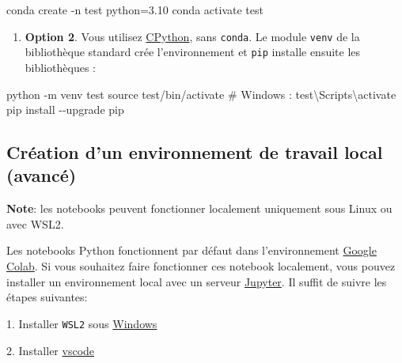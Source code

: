 \documentclass[
  french,
  11pt,
  letterpaper,
  open=any,
  twoside=false,
  french]{scrbook}
\newenvironment{Shaded}{\begin{snugshade}}{\end{snugshade}}
\newcommand{\AttributeTok}[1]{\textcolor[rgb]{0.40,0.45,0.13}{#1}}
\newcommand{\BuiltInTok}[1]{\textcolor[rgb]{0.00,0.23,0.31}{#1}}
\newcommand{\CommentTok}[1]{\textcolor[rgb]{0.37,0.37,0.37}{#1}}
\newcommand{\ExtensionTok}[1]{\textcolor[rgb]{0.00,0.23,0.31}{#1}}
\newcommand{\NormalTok}[1]{\textcolor[rgb]{0.00,0.23,0.31}{#1}}
\providecommand{\tightlist}{%
  \setlength{\itemsep}{0pt}\setlength{\parskip}{0pt}}
\begin{document}
\begin{Shaded}
\begin{Highlighting}[]
\ExtensionTok{conda}\NormalTok{ create }\AttributeTok{{-}n}\NormalTok{ test python=3.10}
\ExtensionTok{conda}\NormalTok{ activate test}
\end{Highlighting}
\end{Shaded}

\begin{enumerate}
\def\labelenumi{\arabic{enumi}.}
\setcounter{enumi}{1}
\tightlist
\item
  \textbf{Option 2}. Vous utilisez
  \href{https://www.python.org/downloads/}{CPython}, sans
  \texttt{conda}. Le module \texttt{venv} de la bibliothèque standard
  crée l'environnement et \texttt{pip} installe ensuite les
  bibliothèques :
\end{enumerate}

\begin{Shaded}
\begin{Highlighting}[]
\ExtensionTok{python} \AttributeTok{{-}m}\NormalTok{ venv test}
\BuiltInTok{source}\NormalTok{ test/bin/activate       }\CommentTok{\# Windows : test\textbackslash{}Scripts\textbackslash{}activate}
\ExtensionTok{pip}\NormalTok{ install }\AttributeTok{{-}{-}upgrade}\NormalTok{ pip}
\end{Highlighting}
\end{Shaded}

\subsection{Création d'un environnement de travail local
(avancé)}\label{cruxe9ation-dun-environnement-de-travail-local-avancuxe9}

\textbf{Note}: les notebooks peuvent fonctionner localement uniquement
sous Linux ou avec WSL2.

Les notebooks Python fonctionnent par défaut dans l'environnement
\href{https://colab.google/}{Google Colab}. Si vous souhaitez faire
fonctionner ces notebook localement, vous pouvez installer un
environnement local avec un serveur
\href{https://jupyterlab.readthedocs.io/en/stable/getting_started/starting.html}{Jupyter}.
Il suffit de suivre les étapes suivantes:

1. Installer \texttt{WSL2} sous
\href{https://learn.microsoft.com/en-us/windows/wsl/install}{Windows}

2. Installer
\href{https://code.visualstudio.com/docs/setup/windows}{vscode}
\end{document}
